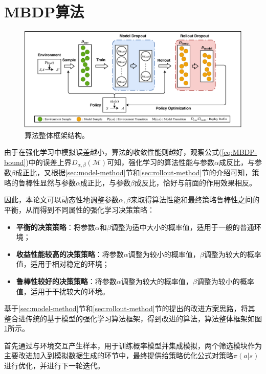 

\section{MBDP算法}

\begin{figure}[tbh]
\centering
\includegraphics[width=\textwidth]{figures/mbdp.pdf}
\caption{算法整体框架结构。}
\label{fig:algo-structure}
\end{figure}

由于在强化学习中模拟误差越小，算法的收敛性能则越好，观察公式(\ref{eq:MBDP-bound})中的误差上界$D_{\alpha,\beta}(\mathcal{M})$可知，强化学习的算法性能与参数$\alpha$成反比，与参数$\beta$成正比，又根据\ref{sec:model-method}节和\ref{sec:rollout-method}节的介绍可知，策略的鲁棒性显然与参数$\alpha$成正比，与参数$\beta$成反比，恰好与前面的作用效果相反。

因此，本论文可以动态性地调整参数$\alpha,\beta$来取得算法性能和最终策略鲁棒性之间的平衡，从而得到不同属性的强化学习决策策略：

\begin{itemize}
    \item \textbf{平衡的决策策略}：将参数$\alpha$和$\beta$调整为适中大小的概率值，适用于一般的普通环境；
    \item \textbf{收益性能较高的决策策略}：将参数$\alpha$调整为较小的概率值，$\beta$调整为较大的概率值，适用于相对稳定的环境；
    \item \textbf{鲁棒性较好的决策策略}：将参数$\alpha$调整为较大的概率值，$\beta$调整为较小的概率值，适用于干扰较大的环境。
\end{itemize}

基于\ref{sec:model-method}节和\ref{sec:rollout-method}节的提出的改进方案思路，将其整合进传统的基于模型的强化学习算法框架，得到改进的算法，算法整体框架如图\ref{fig:algo-structure}所示。

首先通过与环境交互产生样本，用于训练概率模型并集成模拟，两个筛选模块作为主要改进加入到模拟数据生成的环节中，最终提供给策略优化公式对策略$\pi(a|s)$进行优化，并进行下一轮迭代。
